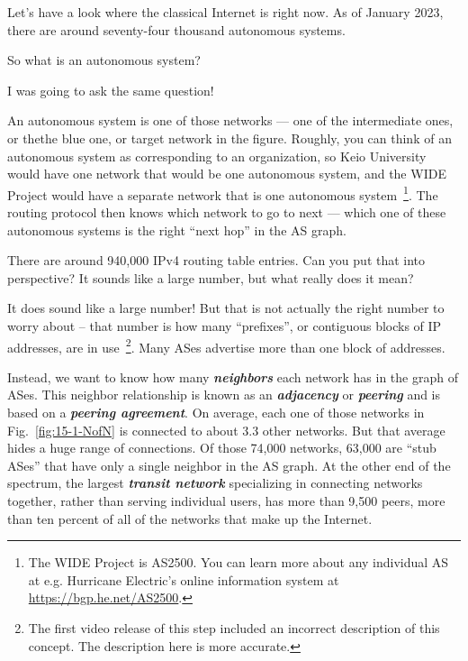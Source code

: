 \mmm Let's have a look where the classical Internet is right now. As of January 2023, there are around seventy-four thousand autonomous systems.

\rrr So what is an autonomous system?

\mmm I was going to ask the same question!

\rrr An autonomous system is one of those networks --- one of the intermediate ones, or thethe blue one, or target network in the figure. Roughly, you can think of an autonomous system as corresponding to an organization, so Keio University would have one network that would be one autonomous system, and the WIDE Project would have a separate network that is one autonomous system~\footnote{The WIDE Project is AS2500. You can learn more about any individual AS at e.g. Hurricane Electric's online information system at \url{https://bgp.he.net/AS2500}.}. The routing protocol then knows which network to go to next --- which one of these autonomous systems is the right ``next hop'' in the AS graph.

\mmm There are around 940,000 IPv4 routing table entries. Can you put that into perspective? It sounds like a large number, but what really does it mean?

\rrr It does sound like a large number! But that is not actually the right number to worry about -- that number is how many ``prefixes'', or contiguous blocks of IP addresses, are in use~\footnote{The first video release of this step included an incorrect description of this concept. The description here is more accurate.}.  Many ASes advertise more than one block of addresses.

Instead, we want to know how many \textbf{\emph{neighbors}} each network has in the graph of ASes.  This neighbor relationship is known as an \textbf{\emph{adjacency}} or \textbf{\emph{peering}} and is based on a \textbf{\emph{peering agreement}}.
On average, each one of those networks in Fig.~\ref{fig:15-1-NofN} is connected to about 3.3 other networks. But that average hides a huge range of connections. Of those 74,000 networks, 63,000 are ``stub ASes'' that have only a single neighbor in the AS graph. At the other end of the spectrum, the largest \textbf{\emph{transit network}} specializing in connecting networks together, rather than serving individual users, has more than 9,500 peers, more than ten percent of all of the networks that make up the Internet.

